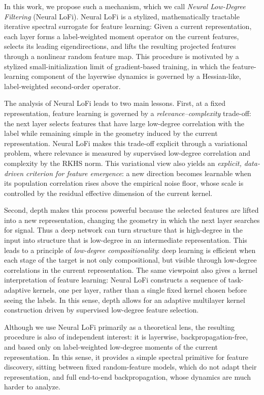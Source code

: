 In this work, we propose such a mechanism, which we call {\it Neural Low-Degree Filtering} (Neural LoFi). Neural LoFi is a stylized, mathematically tractable iterative spectral surrogate for feature learning: Given a current representation, each layer forms a label-weighted moment operator on the current features, selects its leading eigendirections, and lifts the resulting projected features through a nonlinear random feature map. This procedure is motivated by a stylized small-initialization limit of gradient-based training, in which the feature-learning component of the layerwise dynamics is governed by a Hessian-like, label-weighted second-order operator. 



The analysis of Neural LoFi leads to two main lessons. First, at a fixed representation, feature learning is governed by a \emph{relevance--complexity} trade-off: the next layer selects features that have large low-degree correlation with the label while remaining simple in the geometry induced by the current representation. Neural LoFi makes this trade-off explicit through a variational problem, where relevance is measured by supervised low-degree correlation and complexity by the RKHS norm. This variational view also yields an {\it explicit, data-driven criterion for feature emergence}: a new direction becomes learnable when its population correlation rises above the empirical noise floor, whose scale is controlled by the residual effective dimension of the current kernel.


Second, depth makes this process powerful because the selected features are lifted into a new representation, changing the geometry in which the next layer searches for signal. Thus a deep network can turn structure that is high-degree in the input into structure that is low-degree in an intermediate representation. This leads to a principle of {\it low-degree compositionality}: deep learning is efficient when each stage of the target is not only compositional, but visible through low-degree correlations in the current representation. The same viewpoint also gives a kernel interpretation of feature learning: Neural LoFi constructs a sequence of task-adaptive kernels, one per layer, rather than a single fixed kernel chosen before seeing the labels. In this sense, depth allows for an adaptive multilayer kernel construction driven by supervised low-degree feature selection. 

Although we use Neural LoFi primarily as a theoretical lens, the resulting procedure is also of independent interest: it is layerwise, backpropagation-free, and based only on label-weighted low-degree moments of the current representation. In this sense, it provides a simple spectral primitive for feature discovery, sitting between fixed random-feature models, which do not adapt their representation, and full end-to-end backpropagation, whose dynamics are much harder to analyze.


